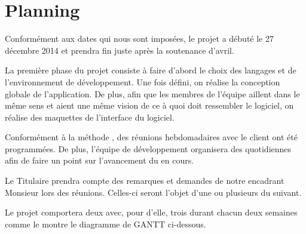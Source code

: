 \chapter{Planning}
Conformément aux dates qui nous sont imposées, le projet a débuté le 27 décembre 2014 et prendra fin juste après la soutenance d'avril.

La première phase du projet consiste à faire d'abord le choix des langages et de l'environnement de développement. Une fois défini, on réalise la conception globale de l'application. De plus, afin que les membres de l'équipe aillent dans le même sens et aient une même vision de ce à quoi doit ressembler le logiciel, on réalise des maquettes de l'interface du logiciel. 

Conformément à la méthode , des réunions hebdomadaires avec le client ont été programmées. De plus, l'équipe de développement organisera des  quotidiennes afin de faire un point sur l'avancement du  en cours. 

Le Titulaire prendra compte des remarques et demandes de notre encadrant Monsieur  lors des réunions. Celles-ci seront l'objet d'une ou plusieurs  du  suivant. 

Le projet comportera deux  avec, pour d'elle, trois  durant chacun deux semaines comme le montre le diagramme de GANTT ci-dessous.